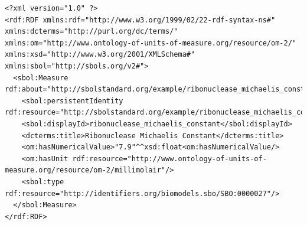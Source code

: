 \begin{lstlisting}
<?xml version="1.0" ?>
<rdf:RDF xmlns:rdf="http://www.w3.org/1999/02/22-rdf-syntax-ns#" xmlns:dcterms="http://purl.org/dc/terms/" xmlns:om="http://www.ontology-of-units-of-measure.org/resource/om-2/" xmlns:xsd="http://www.w3.org/2001/XMLSchema#" xmlns:sbol="http://sbols.org/v2#">
  <sbol:Measure rdf:about="http://sbolstandard.org/example/ribonuclease_michaelis_constant/1">
    <sbol:persistentIdentity rdf:resource="http://sbolstandard.org/example/ribonuclease_michaelis_constant"/>
    <sbol:displayId>ribonuclease_michaelis_constant</sbol:displayId>
    <dcterms:title>Ribonuclease Michaelis Constant</dcterms:title>
    <om:hasNumericalValue>"7.9"^^xsd:float<om:hasNumericalValue/>
    <om:hasUnit rdf:resource="http://www.ontology-of-units-of-measure.org/resource/om-2/millimolair"/>
    <sbol:type rdf:resource="http://identifiers.org/biomodels.sbo/SBO:0000027"/>
  </sbol:Measure>
</rdf:RDF>
\end{lstlisting}
\label{ser:Measure}



